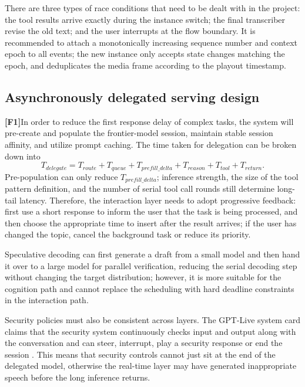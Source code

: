 \documentclass[UTF8,fontset=none,a4paper,10pt]{ctexart}
\newcommand{\FOne}{\textcolor{official}{\textbf{[F1]}}}
\begin{document}
There are three types of race conditions that need to be dealt with in the project: the tool results arrive exactly during the instance switch; the final transcriber revise the old text; and the user interrupts at the flow boundary. It is recommended to attach a monotonically increasing sequence number and context epoch to all events; the new instance only accepts state changes matching the epoch, and deduplicates the media frame according to the playout timestamp.

\subsection{Asynchronously delegated serving design}

\FOne In order to reduce the first response delay of complex tasks, the system will pre-create and populate the frontier-model session, maintain stable session affinity, and utilize prompt caching\cite{en:openai2026continuous}. The time taken for delegation can be broken down into
\begin{equation}
T_{delegate}=T_{route}+T_{queue}+T_{prefill\_delta}+T_{reason}+T_{tool}+T_{return}.
\end{equation}
Pre-population can only reduce $T_{prefill\_delta}$; inference strength, the size of the tool pattern definition, and the number of serial tool call rounds still determine long-tail latency. Therefore, the interaction layer needs to adopt progressive feedback: first use a short response to inform the user that the task is being processed, and then choose the appropriate time to insert after the result arrives; if the user has changed the topic, cancel the background task or reduce its priority.

Speculative decoding can first generate a draft from a small model and then hand it over to a large model for parallel verification, reducing the serial decoding step\cite{en:leviathan2023speculative} without changing the target distribution; however, it is more suitable for the cognition path and cannot replace the scheduling with hard deadline constraints in the interaction path.

Security policies must also be consistent across layers. The GPT-Live system card claims that the security system continuously checks input and output along with the conversation and can steer, interrupt, play a security response or end the session \cite{en:openai2026safety}. This means that security controls cannot just sit at the end of the delegated model, otherwise the real-time layer may have generated inappropriate speech before the long inference returns.
\end{document}
